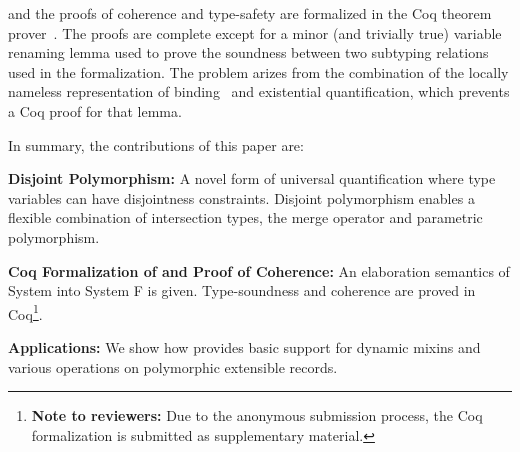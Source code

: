 \name and the proofs of coherence and type-safety are formalized in
the Coq theorem prover~\cite{coq}. The proofs are complete except for a minor
(and trivially true) variable renaming lemma used to prove the
soundness between two subtyping relations used in the
formalization. The problem arizes from the combination of the locally
nameless representation of binding~\cite{aydemir-popl-08} and existential
quantification, which prevents a Coq proof for that lemma.

In summary, the contributions of this paper are:

\begin{itemize*}

\item {\bf Disjoint Polymorphism:} A novel form of universal
quantification where type variables can have disjointness
constraints. Disjoint polymorphism enables a flexible combination
of intersection types, the merge operator and parametric
polymorphism. 

\item {\bf Coq Formalization of \name and Proof of Coherence:} An
  elaboration semantics of System \name into System F is
  given. Type-soundness and coherence are proved in Coq\footnote{{\bf Note to reviewers:} Due
    to the anonymous submission process, the Coq formalization is submitted as supplementary material.}.

\item {\bf Applications:} We show how \name provides basic support
 for dynamic mixins and various operations on polymorphic extensible records.

\end{itemize*}

